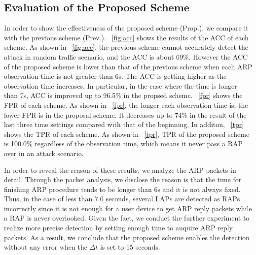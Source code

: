 \documentclass[conference]{IEEEtran}
\begin{document}
\subsection{Evaluation of the Proposed Scheme}
In order to show the effectiveness of the proposed scheme (Prop.), we compare it with the previous scheme \cite{previous} (Prev.).
\figurename~\ref{fig:acc} shows the results of the ACC of each scheme.
As shown in \figurename~\ref{fig:acc}, the previous scheme cannot accurately detect the attack in random traffic scenario, and the ACC is about 69\%.
However the ACC of the proposed scheme is lower than that of the previous scheme when each ARP observation time is not greater than 6s.
The ACC is getting higher as the observation time increases.
In particular, in the case where the time is longer than 7s, ACC is improved up to 96.5\% in the propsed scheme.
\figurename~\ref{fpr} shows the FPR of each scheme.
As shown in \figurename~\ref{fpr}, the longer each observation time is, the lower FPR is in the proposal scheme.
It decreases up to 74\% in the result of the last three time settings compared with that of the beginning.
In additon, \figurename~\ref{tpr} shows the TPR of each scheme.
As shown in \figurename~\ref{tpr}, TPR of the proposed scheme is 100.0\% regardless of the observation time, which means it never pass a RAP over in an attack scenario.

In order to reveal the reason of these results, we analyze the ARP packets in detail.
Through the packet analysis, we disclose the reason is that the time for finishing ARP procedure tends to be longer than 6s and it is not always fixed.
Thus, in the case of less than 7.0 seconds, several LAPs are detected as RAPs incorrectly since it is not enough for a user device to get ARP reply packets while a RAP is never overlooked.
Given the fact, we conduct the further experiment to realize more precise detection by setting enough time to auquire ARP reply packets.
As a result, we conclude that the proposed scheme enables the detection without any error when the $\Delta t$ is set to 15 seconds.
\end{document}
